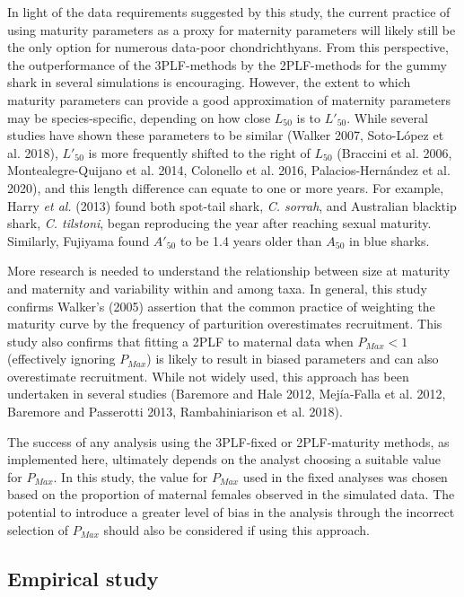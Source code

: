 \documentclass[
]{article}
\begin{document}
In light of the data requirements suggested by this study, the current practice of using maturity parameters as a proxy for maternity parameters will likely still be the only option for numerous data-poor chondrichthyans. From this perspective, the outperformance of the 3PLF-methods by the 2PLF-methods for the gummy shark in several simulations is encouraging. However, the extent to which maturity parameters can provide a good approximation of maternity parameters may be species-specific, depending on how close \(L_{50}\) is to \(L'_{50}\). While several studies have shown these parameters to be similar (Walker 2007, Soto-López et al. 2018), \(L'_{50}\) is more frequently shifted to the right of \(L_{50}\) (Braccini et al. 2006, Montealegre-Quijano et al. 2014, Colonello et al. 2016, Palacios-Hernández et al. 2020), and this length difference can equate to one or more years. For example, Harry \emph{et al.} (2013) found both spot-tail shark, \emph{C. sorrah}, and Australian blacktip shark, \emph{C. tilstoni}, began reproducing the year after reaching sexual maturity. Similarly, Fujiyama found \(A'_{50}\) to be 1.4 years older than \(A_{50}\) in blue sharks.

More research is needed to understand the relationship between size at maturity and maternity and variability within and among taxa. In general, this study confirms Walker's (2005) assertion that the common practice of weighting the maturity curve by the frequency of parturition overestimates recruitment. This study also confirms that fitting a 2PLF to maternal data when \(P_{Max} < 1\) (effectively ignoring \(P_{Max}\)) is likely to result in biased parameters and can also overestimate recruitment. While not widely used, this approach has been undertaken in several studies (Baremore and Hale 2012, Mejía‐Falla et al. 2012, Baremore and Passerotti 2013, Rambahiniarison et al. 2018).

The success of any analysis using the 3PLF-fixed or 2PLF-maturity methods, as implemented here, ultimately depends on the analyst choosing a suitable value for \(P_{Max}\). In this study, the value for \(P_{Max}\) used in the fixed analyses was chosen based on the proportion of maternal females observed in the simulated data. The potential to introduce a greater level of bias in the analysis through the incorrect selection of \(P_{Max}\) should also be considered if using this approach.

\subsection{Empirical study}\label{empirical-study}
\end{document}
